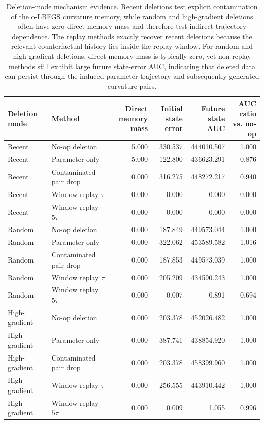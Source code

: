 \documentclass{ssl}
\begin{document}
\begin{landscape}
\begin{table}[t]
\centering
\caption{
Deletion-mode mechanism evidence. 
Recent deletions test explicit contamination of the o-LBFGS curvature memory, while random and high-gradient deletions often have zero direct memory mass and therefore test indirect trajectory dependence. 
The replay methods exactly recover recent deletions because the relevant counterfactual history lies inside the replay window. 
For random and high-gradient deletions, direct memory mass is typically zero, yet non-replay methods still exhibit large future state-error AUC, indicating that deleted data can persist through the induced parameter trajectory and subsequently generated curvature pairs.
}
\label{tab:deletion-mode-mechanism}
\small
\begin{tabularx}{\textwidth}{llrrrr}
\toprule
Deletion mode 
& Method 
& \makecell{Direct\\memory mass}
& \makecell{Initial\\state error}
& \makecell{Future\\state AUC}
& \makecell{AUC ratio\\vs. no-op} \\
\midrule
Recent 
& No-op deletion 
& 5.000 & 330.537 & 444010.507 & 1.000 \\
Recent 
& Parameter-only 
& 5.000 & 122.800 & 436623.291 & 0.876 \\
Recent 
& Contaminated pair drop 
& 0.000 & 316.275 & 448272.217 & 0.940 \\
Recent 
& Window replay $\tau$ 
& 0.000 & 0.000 & 0.000 & 0.000 \\
Recent 
& Window replay $5\tau$ 
& 0.000 & 0.000 & 0.000 & 0.000 \\
\midrule
Random 
& No-op deletion 
& 0.000 & 187.849 & 449573.044 & 1.000 \\
Random 
& Parameter-only 
& 0.000 & 322.062 & 453589.582 & 1.016 \\
Random 
& Contaminated pair drop 
& 0.000 & 187.853 & 449573.039 & 1.000 \\
Random 
& Window replay $\tau$ 
& 0.000 & 205.209 & 434590.243 & 1.000 \\
Random 
& Window replay $5\tau$ 
& 0.000 & 0.007 & 0.891 & 0.694 \\
\midrule
High-gradient 
& No-op deletion 
& 0.000 & 203.378 & 452026.482 & 1.000 \\
High-gradient 
& Parameter-only 
& 0.000 & 387.741 & 438854.920 & 1.000 \\
High-gradient 
& Contaminated pair drop 
& 0.000 & 203.378 & 458399.960 & 1.000 \\
High-gradient 
& Window replay $\tau$ 
& 0.000 & 256.555 & 443910.442 & 1.000 \\
High-gradient 
& Window replay $5\tau$ 
& 0.000 & 0.009 & 1.055 & 0.996 \\
\bottomrule
\end{tabularx}
\end{table}
\end{landscape}
\end{document}
